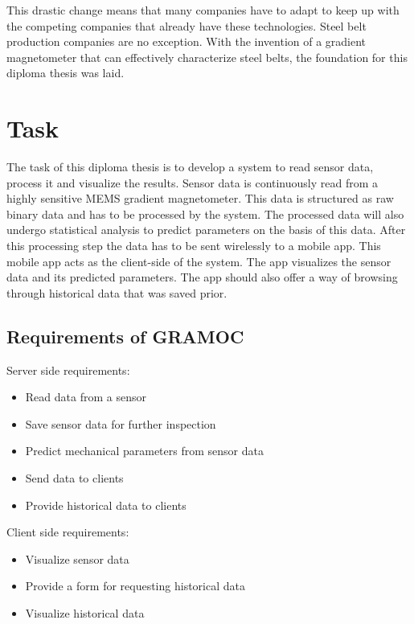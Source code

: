 This drastic change means that many companies have to adapt to keep up with the competing companies that already have these technologies. Steel belt production companies are no exception. With the invention of a gradient magnetometer that can effectively characterize steel belts, the foundation for this diploma thesis was laid.

\section{Task}

The task of this diploma thesis is to develop a system to read sensor data, process it and visualize the results. Sensor data is continuously read from a highly sensitive MEMS gradient magnetometer. This data is structured as raw binary data and has to be processed by the system. The processed data will also undergo statistical analysis to predict parameters on the basis of this data. After this processing step the data has to be sent wirelessly to a mobile app. This mobile app acts as the client-side of the system. The app visualizes the sensor data and its predicted parameters. The app should also offer a way of browsing through historical data that was saved prior.

\subsection{Requirements of GRAMOC}

Server side requirements:

\begin{itemize}
    \item Read data from a sensor
    \item Save sensor data for further inspection
    \item Predict mechanical parameters from sensor data
    \item Send data to clients
    \item Provide historical data to clients
\end{itemize}

Client side requirements:

\begin{itemize}
    \item Visualize sensor data
    \item Provide a form for requesting historical data
    \item Visualize historical data
\end{itemize}

